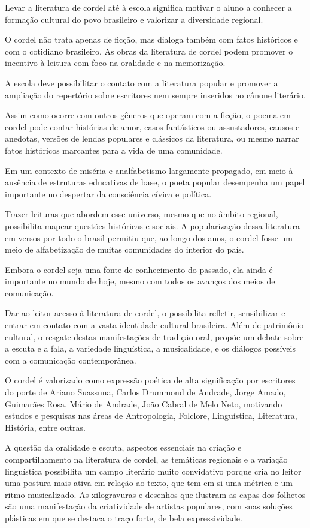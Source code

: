 \documentclass[12pt]{extarticle}
\begin{document}
Levar a literatura de cordel até à escola significa motivar o aluno a conhecer
a formação cultural do povo brasileiro e valorizar a diversidade regional.

O cordel não trata apenas de ficção, mas dialoga também com fatos históricos
e com o cotidiano brasileiro. As obras da literatura de cordel podem promover
o incentivo à leitura com foco na oralidade e na memorização.

A escola deve possibilitar o contato com a literatura popular e promover
a ampliação do repertório sobre escritores nem sempre inseridos no cânone
literário.

Assim como ocorre com outros gêneros que operam com a ficção, o poema em cordel
pode contar histórias de amor, casos fantásticos ou assustadores, causos
e anedotas, versões de lendas populares e clássicos da literatura, ou mesmo
narrar fatos históricos marcantes para a vida de uma comunidade.

Em um contexto de miséria e analfabetismo largamente propagado, em meio
à ausência de estruturas educativas de base, o poeta popular desempenha um
papel importante no despertar da consciência cívica e política.

Trazer leituras que abordem esse universo, mesmo que no âmbito regional,
possibilita mapear questões históricas e sociais. A popularização dessa
literatura em versos por todo o brasil permitiu que, ao longo dos anos,
o cordel fosse um meio de alfabetização de muitas comunidades do interior do
país.

Embora o cordel seja uma fonte de conhecimento do passado, ela ainda
é importante no mundo de hoje, mesmo com todos os avanços dos meios de
comunicação.

Dar ao leitor acesso à literatura de cordel, o possibilita refletir,
sensibilizar e entrar em contato com a vasta identidade cultural brasileira.
Além de patrimônio cultural, o resgate destas manifestações de tradição oral,
propõe um debate sobre a escuta e a fala, a variedade linguística,
a musicalidade, e os diálogos possíveis com a comunicação contemporânea.

O cordel é valorizado como expressão poética de alta significação por
escritores do porte de Ariano Suassuna, Carlos Drummond de Andrade, Jorge
Amado, Guimarães Rosa, Mário de Andrade, João Cabral de Melo Neto, motivando
estudos e pesquisas nas áreas de Antropologia, Folclore, Linguística,
Literatura, História, entre outras.

A questão da oralidade e escuta, aspectos essenciais na criação
e compartilhamento na literatura de cordel, as temáticas regionais e a variação
linguística possibilita um campo literário muito convidativo porque cria no
leitor uma postura mais ativa em relação ao texto, que tem em si uma métrica
e um ritmo musicalizado. As xilogravuras e desenhos que ilustram as capas dos
folhetos são uma manifestação da criatividade de artistas populares, com suas
soluções plásticas em que se destaca o traço forte, de bela expressividade.
\end{document}
